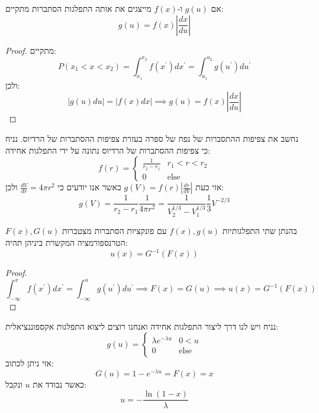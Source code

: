\documentclass{tstextbook}
\begin{document}
\begin{proposition}
אם \(g(u)\) ו-\(f(x)\) מייצגים את אותה התפלגות הסתברות מתקיים:
$$g(u)=f(x)\left|{\frac{d x}{d u}}\right|$$

\end{proposition}
\begin{proof}
מתקיים:
$$P(x_{1}<x<x_{2})=\int_{x_{1}}^{x_{2}}f(x^{\prime})d x^{\prime}=\int_{u_{1}}^{u_{2}}g(u^{\prime})d u^{\prime}$$
ולכן:
$$|g(u)d u|=|f(x)d x|\implies g(u)=f(x)\left|{\frac{d x}{d u}}\right|$$

\end{proof}
\begin{example}
נחשב את צפיפות ההתסברות של נפח של ספרה בעזרת צפיפות ההסתברות של הרדיוס. נניח כי צפיפות ההסתברות של הרדיוס נתונה על ידי התפלגות אחידה:
$$f(r)=\begin{cases}\frac{1}{r_{2}-r_{1}} & r_{1}<r<r_{2} \\0 & \text{else}
\end{cases}$$
אזי כעת \(g(V)=f(r)\left|{\frac{d r}{d V}}\right|\) כאשר אנו יודעים כי \({\frac{d V}{d r}}=4\pi r^{2}\) ולכן:
$$g(V)=\frac{1}{r_{2}-r_{1}}\frac{1}{4\pi r^{2}}=\frac{1}{V_{2}^{1/3}-V_{1}^{1/3}}\frac{1}{3}V^{-2/3}$$

\end{example}
\begin{proposition}
בהנתן שתי התפלגותיות \(f(x),g(u)\) עם פונקציות הסתברות מצטברות \(F(x),G(u)\) הטרנספורמציה המקשרת ביניהן תהיה:
$$u(x)=G^{-1}(F(x))$$

\end{proposition}
\begin{proof}
$$\int_{-\infty}^{x}f\left( x^{\prime} \right)d x^{\prime}=\int_{-\infty}^{u}g\left( u^{\prime} \right)d u^{\prime}\implies F(x)=G(u)\implies u(x)=G^{-1}(F(x))$$

\end{proof}
\begin{example}
נניח ויש לנו דרך ליצור התפלגות אחידה ואנחנו רוצים ליצוא התפלגות אקספוננציאלית:
$$g(u)=\begin{cases}\lambda e^{ -\lambda u } & 0<u \\0 & \text{else}
\end{cases}$$
אזי ניתן לכתוב:
$$G(u)=1-e^{-\lambda u}=F(x)=x$$
כאשר נבודד את \(u\) ונקבל:
$$u=-\frac{\ln(1-x)}{\lambda}$$

\end{example}
\begin{proposition}
\end{proposition}
\end{document}

